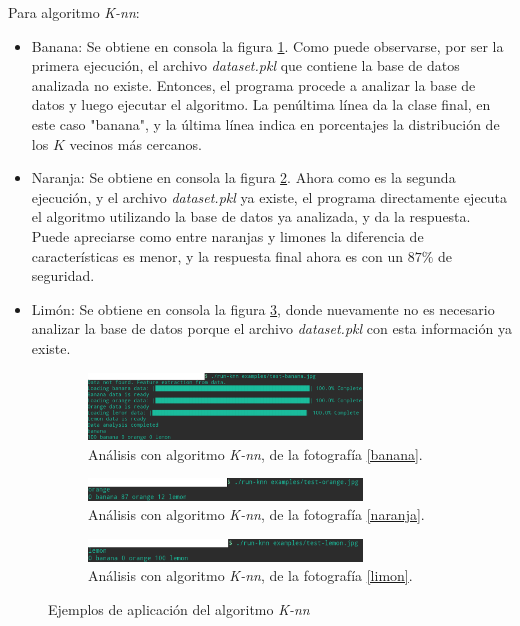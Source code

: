 \documentclass[10pt,a4paper]{article}
\begin{document}
Para algoritmo \textit{K-nn}:
\begin{itemize}
\item Banana: Se obtiene en consola la figura \ref{knn-banana}. Como puede observarse, por ser la primera ejecución, el archivo \textit{dataset.pkl} que contiene la base de datos analizada no existe. Entonces, el programa procede a analizar la base de datos y luego ejecutar el algoritmo. La penúltima línea da la clase final, en este caso "banana", y la última línea indica en porcentajes la distribución de los $K$ vecinos más cercanos.

\item Naranja: Se obtiene en consola la figura \ref{knn-naranja}. Ahora como es la segunda ejecución, y el archivo \textit{dataset.pkl} ya existe, el programa directamente ejecuta el algoritmo utilizando la base de datos ya analizada, y da la respuesta. Puede apreciarse como entre naranjas y limones la diferencia de características es menor, y la respuesta final ahora es con un $87\%$ de seguridad.

\item Limón: Se obtiene en consola la figura \ref{knn-limon}, donde nuevamente no es necesario analizar la base de datos porque el archivo \textit{dataset.pkl} con esta información ya existe.
\end{itemize}

\begin{figure}[h]
    \centering
    \begin{subfigure}[b]{\textwidth}
        \centering
		\includegraphics[width=0.8\textwidth]{imgs/knn-banana.png}
		\caption{Análisis con algoritmo \textit{K-nn}, de la fotografía \ref{banana}.}
		\label{knn-banana}
    \end{subfigure}
    \begin{subfigure}[b]{\textwidth}
    	\centering
        \includegraphics[width=0.8\textwidth]{imgs/knn-orange.png}
		\caption{Análisis con algoritmo \textit{K-nn}, de la fotografía \ref{naranja}.}
		\label{knn-naranja}
    \end{subfigure}
    \begin{subfigure}[b]{\textwidth}
        \centering
		\includegraphics[width=0.8\textwidth]{imgs/knn-lemon.png}
		\caption{Análisis con algoritmo \textit{K-nn}, de la fotografía \ref{limon}.}
		\label{knn-limon}
    \end{subfigure}
    \caption{Ejemplos de aplicación del algoritmo \textit{K-nn}}\label{knn-aplicacion}
\end{figure}
\end{document}
